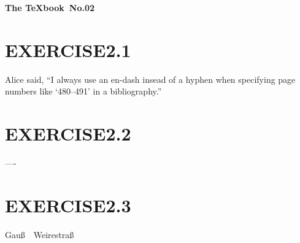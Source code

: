 \documentclass[leqno]{ltjsarticle}%
\begin{document}
\textbf{\LARGE{The \TeX book}\ \Large{No.02}}\hspace{\fill} 
\section*{EXERCISE2.1}
  Alice said, ``I always use an en-dash insead of a hyphen when specifying page numbers like `480--491' in a bibliography.''
\section*{EXERCISE2.2}
  ----  
\section*{EXERCISE2.3}
  Gau\ss \ \ Weirestra\ss
\end{document}
